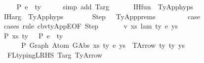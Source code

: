 \begin{isabellebody}
\ \ \isamarkupfalse%
\ {\isachardoublequoteopen}{\isasymGamma}\ {\isasymturnstile}{\isacharbraceleft}{\kern0pt}P{\isacharbraceright}{\kern0pt}\ e{}\ {\isacharcolon}{\kern0pt}\ ty{}{\isachardoublequoteclose}\isanewline
\ \ \ \ \isamarkupfalse%
\ {\isacharparenleft}{\kern0pt}simp\ add{\isacharcolon}{\kern0pt}\ T{\isacharunderscore}{\kern0pt}arg{\isacharparenright}{\kern0pt}\isanewline
\isanewline
\ \ \isanewline
\ \ \isamarkupfalse%
\ IH{\isacharunderscore}{\kern0pt}fun\ {\isacharequal}{\kern0pt}\ TyApp{\isachardot}{\kern0pt}hyps{\isacharparenleft}{\kern0pt}{}{\isacharparenright}{\kern0pt}\ \ \ \ \isanewline
\ \ \isamarkupfalse%
\ IH{\isacharunderscore}{\kern0pt}arg\ {\isacharequal}{\kern0pt}\ TyApp{\isachardot}{\kern0pt}hyps{\isacharparenleft}{\kern0pt}{}{\isacharparenright}{\kern0pt}\ \ \ \ \isanewline
\ \ \isamarkupfalse%
\ Step\ \ {\isacharequal}{\kern0pt}\ TyApp{\isachardot}{\kern0pt}prems\ \ \ \ \ \isanewline
\isanewline
\ \ \isamarkupfalse%
\ {\isacharquery}{\kern0pt}case\isanewline
\ \ \isamarkupfalse%
\ {\isacharparenleft}{\kern0pt}cases\ rule{\isacharcolon}{\kern0pt}\ cbv{\isacharunderscore}{\kern0pt}ty{\isacharunderscore}{\kern0pt}AppE{\isacharbrackleft}{\kern0pt}OF\ Step{\isacharbrackright}{\kern0pt}{\isacharparenright}{\kern0pt}\isanewline
\ \ \ \ \isamarkupfalse%
\ {\isacharparenleft}{\kern0pt}{}\ v\ xs\ lam\ ty\ e\ ys{\isacharparenright}{\kern0pt}\isanewline
\isanewline
\ \ \ \ \isamarkupfalse%
\ P{}{\isacharcolon}{\kern0pt}\ {\isachardoublequoteopen}{\isacharparenleft}{\kern0pt}xs{\isacharcomma}{\kern0pt}\ ty{}{\isacharparenright}{\kern0pt}\ {\isacharhash}{\kern0pt}\ {\isasymGamma}\ {\isasymturnstile}{\isacharbraceleft}{\kern0pt}P{\isacharbraceright}{\kern0pt}\ e\ {\isacharcolon}{\kern0pt}\ ty{}\ {\isacharequal}{\kern0pt}{\isacharequal}{\kern0pt}{\isachargreater}{\kern0pt}\isanewline
\ \ \ \ \ {\isasymGamma}\ {\isasymturnstile}{\isacharbraceleft}{\kern0pt}P{\isacharbraceright}{\kern0pt}\ Graph\ {\isacharparenleft}{\kern0pt}Atom\ {\isacharparenleft}{\kern0pt}GAbs\ xs\ ty{}\ e{\isacharparenright}{\kern0pt}\ ys{\isacharparenright}{\kern0pt}\ {\isacharcolon}{\kern0pt}\ TArrow\ ty{}\ ty{}\ ys{\isachardoublequoteclose}\isanewline
\ \ \ \ \ \ \isamarkupfalse%
\ {\isachardoublequoteopen}{}{\isachardoublequoteclose}{\isacharparenleft}{\kern0pt}{}{\isacharcomma}{\kern0pt}{}{\isacharcomma}{\kern0pt}{}{\isacharparenright}{\kern0pt}\ FL{\isacharunderscore}{\kern0pt}typing{\isacharunderscore}{\kern0pt}LRHS\ T{\isacharunderscore}{\kern0pt}arg\ TyArrow\ \isamarkupfalse%

\end{isabellebody}
